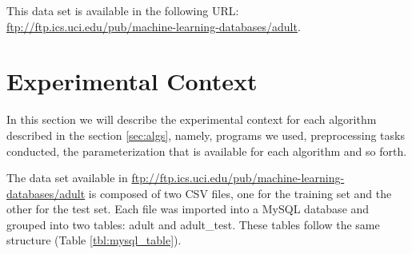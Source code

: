 \documentclass[a4paper]{llncs}
\begin{document}
This data set is available in the following URL: \url{ftp://ftp.ics.uci.edu/pub/machine-learning-databases/adult}.

\section{Experimental Context}

In this section we will describe the experimental context for each
algorithm described in the section \ref{sec:algs}, namely, programs we used,
preprocessing tasks conducted, the parameterization that is available for each
algorithm and so forth.

The data set available in \url{ftp://ftp.ics.uci.edu/pub/machine-learning-databases/adult}
is composed of two CSV files, one for the training set and the other for the test set.
Each file was imported into a MySQL database and grouped into two tables: adult and adult\_test.
These tables follow the same structure (Table \ref{tbl:mysql_table}).
\end{document}
